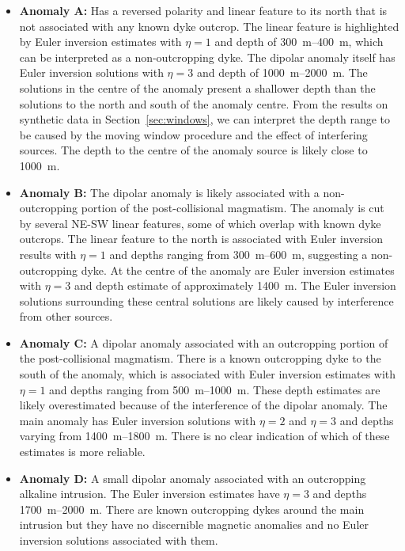 \begin{itemize}
\item \textbf{Anomaly A:} Has a reversed polarity and linear feature to its
    north that is not associated with any known dyke outcrop. The linear
    feature is highlighted by Euler inversion estimates with $\eta=1$ and depth
    of \qtyrange{300}{400}{\m}, which can be interpreted as a non-outcropping
    dyke. The dipolar anomaly itself has Euler inversion solutions with
    $\eta=3$ and depth of \qtyrange{1000}{2000}{\m}.
    The solutions in the centre of the anomaly present a shallower depth than
    the solutions to the north and south of the anomaly centre. From the
    results on synthetic data in Section~\ref{sec:windows}, we can interpret
    the depth range to be caused by the moving window procedure and the effect
    of interfering sources. The depth to the centre of the anomaly source is
    likely close to \qty{1000}{\m}.

\item \textbf{Anomaly B:} The dipolar anomaly is likely associated with
    a non-outcropping portion of the post-collisional magmatism. The anomaly is
    cut by several NE-SW linear features, some of which overlap with known dyke
    outcrops. The linear feature to the north is associated with Euler
    inversion results with $\eta=1$ and depths ranging from
    \qtyrange{300}{600}{\m}, suggesting a non-outcropping dyke. At the centre
    of the anomaly are Euler inversion estimates with $\eta=3$ and depth
    estimate of approximately \qty{1400}{\m}. The Euler inversion solutions
    surrounding these central solutions are likely caused by interference from
    other sources.

\item \textbf{Anomaly C:} A dipolar anomaly associated with an outcropping
    portion of the post-collisional magmatism. There is a known outcropping
    dyke to the south of the anomaly, which is associated with Euler inversion
    estimates with $\eta=1$ and depths ranging from \qtyrange{500}{1000}{\m}.
    These depth estimates are likely overestimated because of the interference
    of the dipolar anomaly. The main anomaly has Euler inversion solutions with
    $\eta=2$ and $\eta=3$ and depths varying from \qtyrange{1400}{1800}{\m}.
    There is no clear indication of which of these estimates is more reliable.

\item \textbf{Anomaly D:} A small dipolar anomaly associated with an
    outcropping alkaline intrusion. The Euler inversion estimates have $\eta=3$
    and depths \qtyrange{1700}{2000}{\m}. There are known outcropping dykes
    around the main intrusion but they have no discernible magnetic anomalies
    and no Euler inversion solutions associated with them.
\end{itemize}

